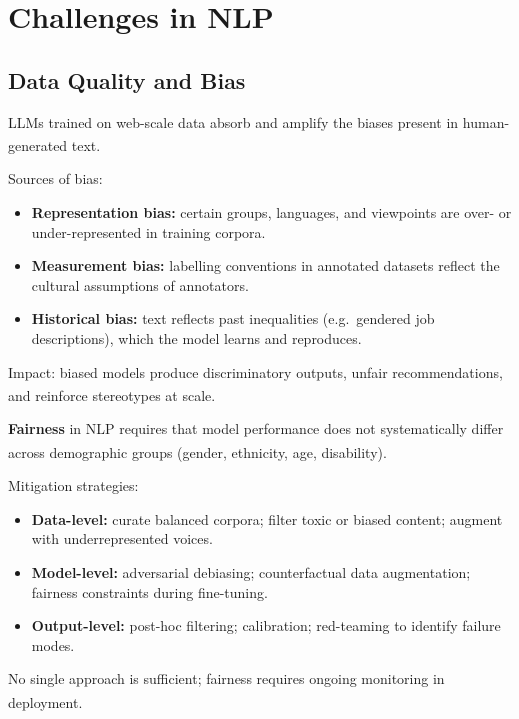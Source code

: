 \section{Challenges in NLP}

\subsection{Data Quality and Bias}

\begin{tcbitemize}[ skin=sectionraster ]

    \tcbitem[title=Training Data Bias, raster multicolumn=3]
    LLMs trained on web-scale data absorb and amplify the biases present in
    human-generated
    text.\textsuperscript{\cite[][p.~xii]{dhamaniIntroductionGenerativeAI2024}}

    Sources of bias:
    \begin{itemize}
        \item \textbf{Representation bias:} certain groups, languages, and viewpoints
              are over- or under-represented in training corpora.
        \item \textbf{Measurement bias:} labelling conventions in annotated datasets
              reflect the cultural assumptions of annotators.
        \item \textbf{Historical bias:} text reflects past inequalities (e.g.\ gendered
              job descriptions), which the model learns and reproduces.
    \end{itemize}

    Impact: biased models produce discriminatory outputs, unfair recommendations, and
    reinforce stereotypes at
    scale.\textsuperscript{\cite[][p.~xii]{dhamaniIntroductionGenerativeAI2024}}

    \tcbitem[title={Fairness and Debiasing}, raster multicolumn=3]
    \textbf{Fairness} in NLP requires that model performance does not systematically
    differ across demographic groups (gender, ethnicity, age,
    disability).\textsuperscript{\cite[][p.~140]{farrisHowLargeLanguage2025}}

    Mitigation strategies:
    \begin{itemize}
        \item \textbf{Data-level:} curate balanced corpora; filter toxic or biased
              content; augment with underrepresented voices.
        \item \textbf{Model-level:} adversarial debiasing; counterfactual data
              augmentation; fairness constraints during fine-tuning.
        \item \textbf{Output-level:} post-hoc filtering; calibration; red-teaming to
              identify failure modes.
    \end{itemize}

    No single approach is sufficient; fairness requires ongoing monitoring in
    deployment.\textsuperscript{\cite[][p.~140]{farrisHowLargeLanguage2025}}

\end{tcbitemize}
